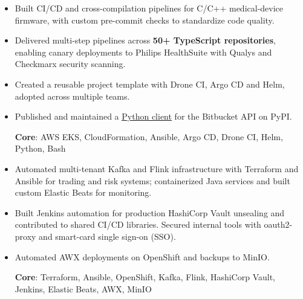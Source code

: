 
\begin{itemize}
\item Built CI/CD and cross-compilation pipelines for C/C++ medical-device
firmware, with custom pre-commit checks to standardize code quality.
\item Delivered multi-step pipelines across \textbf{50+ TypeScript repositories},
enabling canary deployments to Philips HealthSuite with Qualys and
Checkmarx security scanning.
\item Created a reusable project template with Drone CI, Argo CD and Helm,
adopted across multiple teams.
\item Published and maintained a
\href{https://pypi.org/project/bitbucket-python-client/}{\uline{Python client}}
for the Bitbucket API on PyPI.
\par\smallskip
\textbf{Core}: AWS EKS, CloudFormation, Ansible, Argo CD, Drone CI, Helm,
Python, Bash
\end{itemize}

\divider

\begin{itemize}
\item Automated multi-tenant Kafka and Flink infrastructure with Terraform and
Ansible for trading and risk systems; containerized Java services and built
custom Elastic Beats for monitoring.
\item Built Jenkins automation for production HashiCorp Vault unsealing and
contributed to shared CI/CD libraries. Secured internal tools with
oauth2-proxy and smart-card single sign-on (SSO).
\item Automated AWX deployments on OpenShift and backups to MinIO.
\par\smallskip
\textbf{Core}: Terraform, Ansible, OpenShift, Kafka, Flink, HashiCorp Vault,
Jenkins, Elastic Beats, AWX, MinIO
\end{itemize}
